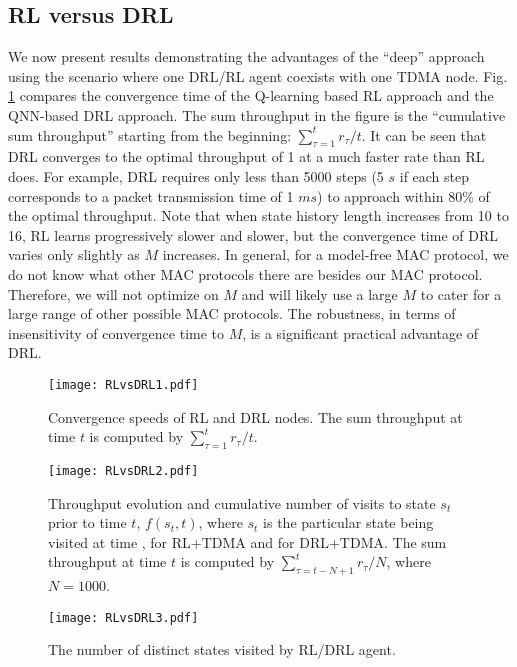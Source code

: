 \documentclass[journal,comsoc]{IEEEtran}
\begin{document}
\subsection{RL versus DRL}\label{RLvsDRL}
We now present results demonstrating the advantages of the ``deep'' approach using the scenario where one DRL/RL agent coexists with one TDMA node. Fig. \ref{fig:RLvsDRL1} compares the convergence time of the Q-learning based RL approach and the QNN-based DRL approach. The sum throughput in the figure is the ``cumulative sum throughput'' starting from the beginning:  $ \sum\nolimits_{\tau  = 1}^t {{r_\tau }} /t $. It can be seen that DRL converges to the optimal throughput of 1 at a much faster rate than RL does. For example, DRL requires only less than 5000 steps (5 $ s $ if each step corresponds to a packet transmission time of 1 $ ms $) to approach within 80$\%$ of the optimal throughput. Note that when state history length  increases from 10 to 16, RL learns progressively slower and slower, but the convergence time of DRL varies only slightly as $ M $ increases. In general, for a model-free MAC protocol, we do not know what other MAC protocols there are besides our MAC protocol. Therefore, we will not optimize on $M$ and will likely use a large $M$  to cater for a large range of other possible MAC protocols. The robustness, in terms of insensitivity of convergence time to $M$, is a significant practical advantage of DRL. 
\begin{figure}[!t]
	\centering
	\texttt{[image: RLvsDRL1.pdf]}
	\caption{Convergence speeds of RL and DRL nodes. The sum throughput at time $ t $  is computed by   $\sum\nolimits_{\tau  = 1}^t {{r_\tau }/t} $.}
	\label{fig:RLvsDRL1}
\end{figure}
\begin{figure}[!t]
	\centering
	\texttt{[image: RLvsDRL2.pdf]}
	\caption{Throughput evolution and cumulative number of visits to state  $ s_t $  prior to time $ t $,  $ f\left( s_t, t\right)  $, where  $ s_t $  is the particular state being visited at time  , for RL+TDMA and for DRL+TDMA. The sum throughput at time $ t $  is computed by  $\sum\nolimits_{\tau  = t - N + 1}^t {{r_\tau }/N} $, where   $ N=1000 $. }
	\label{fig:RLvsDRL2}
\end{figure}
\begin{figure}[!t]
	\centering
	\texttt{[image: RLvsDRL3.pdf]}
	\caption{The number of distinct states visited by RL/DRL agent.}
	\label{fig:RLvsDRL3}
\end{figure}
\end{document}
